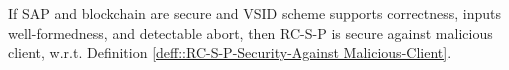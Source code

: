 %  
%     
%     
   




\begin{lemma}\label{lem::RC-S-P-Security-Against Malicious-Client}
 If SAP and blockchain are secure and  VSID scheme supports correctness, inputs well-formedness, and detectable abort, then RC-S-P is secure against malicious client, w.r.t. Definition \ref{deff::RC-S-P-Security-Against Malicious-Client}. 
\end{lemma}



